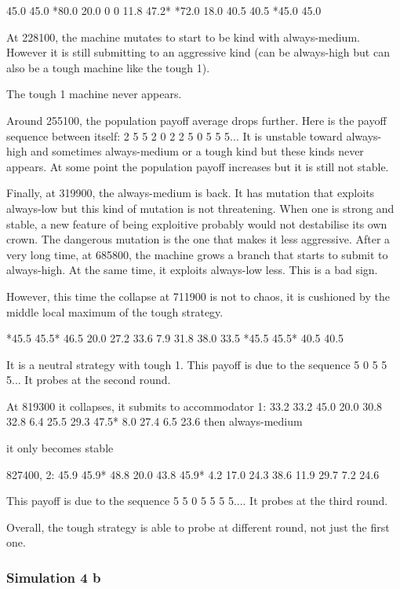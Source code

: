 \documentclass[12.5pt]{report}
\begin{document}
45.0 45.0     *80.0 20.0         0 0         11.8 47.2*    *72.0 18.0      40.5 40.5     *45.0 45.0

At 228100, the machine mutates to start to be kind with always-medium. However it is still submitting to an aggressive kind (can be always-high but can also be a tough machine like the tough 1).

The tough 1 machine never appears.

Around 255100, the population payoff average drops further. Here is the payoff sequence between itself: 2 5 5 2 0 2 2 5 0 5 5 5... It is unstable toward always-high and sometimes always-medium or a tough kind but these kinds never appears. At some point the population payoff increases but it is still not stable.

Finally, at 319900, the always-medium is back. It has mutation that exploits always-low but this kind of mutation is not threatening. When one is strong and stable, a new feature of being exploitive probably would not destabilise its own crown. The dangerous mutation is the one that makes it less aggressive. After a very long time, at 685800, the machine grows a branch that starts to submit to always-high. At the same time, it exploits always-low less. This is a bad sign.

However, this time the collapse at 711900 is not to chaos, it is cushioned by the middle local maximum of the tough strategy.

*45.5 45.5*     46.5 20.0      27.2 33.6      7.9 31.8       38.0 33.5     *45.5 45.5*     40.5 40.5

It is a neutral strategy with tough 1. This payoff is due to the sequence 5 0 5 5 5... It probes at the second round.

At 
819300 it collapses, it submits to accommodator 1:  33.2 33.2    45.0 20.0    30.8 32.8     6.4 25.5    29.3 47.5*    8.0 27.4     6.5 23.6   
then always-medium

it only becomes stable 

827400, 2:  45.9 45.9*   48.8 20.0    43.8 45.9*    4.2 17.0    24.3 38.6    11.9 29.7     7.2 24.6  

This payoff is due to the sequence 5 5 0 5 5 5 5.... It probes at the third round.


Overall, the tough strategy is able to probe at different round, not just the first one.



\subsubsection{Simulation 4 b}
\end{document}
